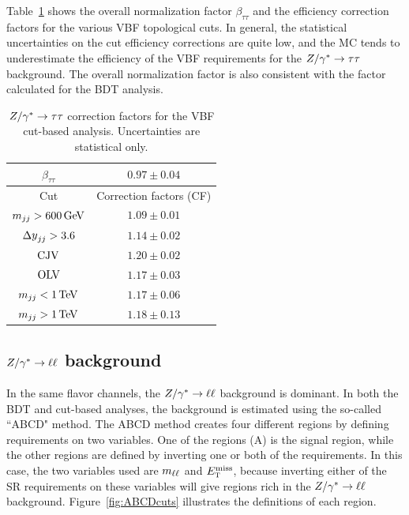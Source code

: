 Table~\ref{tab:vbf_cb_zttnf} shows the overall normalization factor $\beta_{\tau\tau}$ and the efficiency correction factors for the various VBF topological cuts. In general, the statistical uncertainties on the cut efficiency corrections are quite low, and the MC tends to underestimate the efficiency of the VBF requirements for the $Z/\gamma^{\ast}\to\tau\tau$ background. The overall normalization factor is also consistent with the factor calculated for the BDT analysis.

\begin{table}[h!]
\centering
\captionsetup{justification=centering}
\begin{tabular}{|c|c|}
\hline
$\beta_{\tau\tau}$ & $0.97 \pm 0.04$ \\ \hline\hline
 Cut & Correction factors (CF) \\ \hline
$\mjj > 600 \GeV$ & $1.09 \pm 0.01$ \\ \hline
$\dyjj > 3.6 $ & $1.14 \pm 0.02$ \\ \hline
$\rm CJV$ & $1.20 \pm 0.02$ \\ \hline
$\rm OLV$ & $1.17 \pm 0.03$ \\ \hline
$\mjj < 1 \TeV$ & $1.17 \pm 0.06$ \\ \hline
$\mjj > 1 \TeV$ & $1.18 \pm 0.13$ \\ \hline 
\end{tabular}
\caption{$Z/\gamma^{\ast} \to\tau\tau$ correction factors for the VBF cut-based analysis. Uncertainties are statistical only.}
\label{tab:vbf_cb_zttnf}
\end{table}

\subsection{$Z/\gamma^{\ast} \to \ell\ell$ background}

In the same flavor channels, the $Z/\gamma^{\ast} \to \ell\ell$ background is dominant. In both the BDT and cut-based analyses, the background is estimated using the so-called ``ABCD" method. The ABCD method creates four different regions by defining requirements on two variables. One of the regions (A) is the signal region, while the other regions are defined by inverting one or both of the requirements. In this case, the two variables used are $m_{\ell\ell}$ and $E_{\textrm{\footnotesize\sc t}}^{\rm miss}$, because inverting either of the SR requirements on these variables will give regions rich in the $Z/\gamma^{\ast}\to\ell\ell$ background. Figure~\ref{fig:ABCDcuts} illustrates the definitions of each region. 


